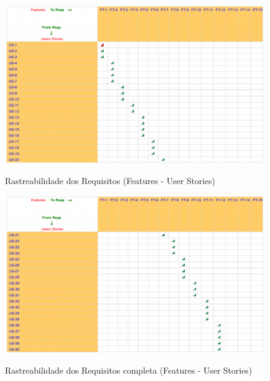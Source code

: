 \FloatBarrier
\begin{figure}[!htpd]
		\centering
		\includegraphics[scale=0.25]{figuras/rast2}
		\label{img:rast2}
		\caption{Rastreabilidade dos Requisitos (Features - User Stories)}
\end{figure}

\FloatBarrier
\begin{figure}[!htpd]
		\centering
		\includegraphics[scale=0.25]{figuras/rast3}
		\label{img:rast3}
		\caption{Rastreabilidade dos Requisitos completa (Features - User Stories)}
\end{figure}
